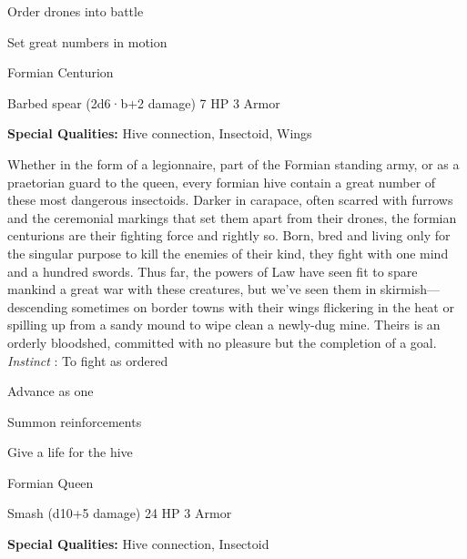 \startitemize[1,packed]

\item Order drones into battle

 
\item Set great numbers in motion


\stopitemize
 
\startMonsterName
Formian Centurion	 
\stopMonsterName
 

Barbed spear (2d6·b+2 damage)	7 HP	3 Armor

 


 
\startMonsterQualities
{\bf Special Qualities:}  Hive connection, Insectoid, Wings
\stopMonsterQualities
 
\startMonsterDescription
Whether in the form of a legionnaire, part of the Formian standing army, or as a praetorian guard to the queen, every formian hive contain a great number of these most dangerous insectoids. Darker in carapace, often scarred with furrows and the ceremonial markings that set them apart from their drones, the formian centurions are their fighting force and rightly so. Born, bred and living only for the singular purpose to kill the enemies of their kind, they fight with one mind and a hundred swords. Thus far, the powers of Law have seen fit to spare mankind a great war with these creatures, but we’ve seen them in skirmish—descending sometimes on border towns with their wings flickering in the heat or spilling up from a sandy mound to wipe clean a newly-dug mine. Theirs is an orderly bloodshed, committed with no pleasure but the completion of a goal. {\em Instinct} : To fight as ordered
\stopMonsterDescription
 
\startitemize[1,packed]

\item Advance as one

 
\item Summon reinforcements

 
\item Give a life for the hive


\stopitemize
 
\startMonsterName
Formian Queen	 
\stopMonsterName
 

Smash (d10+5 damage)	24 HP	3 Armor

 


 
\startMonsterQualities
{\bf Special Qualities:}  Hive connection, Insectoid
\stopMonsterQualities
 
